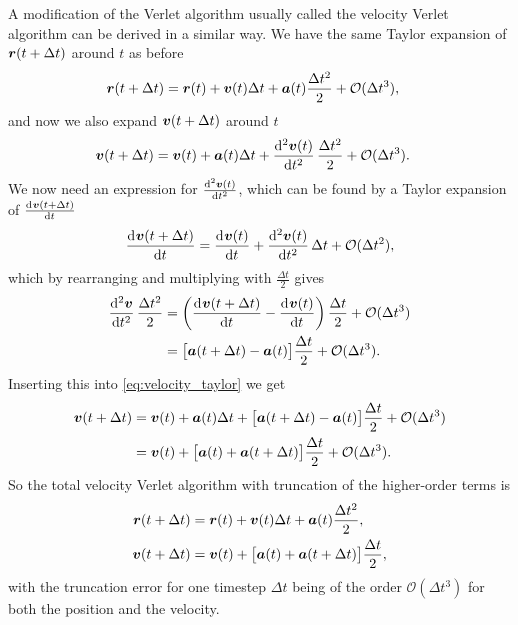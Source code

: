 A modification of the Verlet algorithm usually called the velocity Verlet algorithm\cite{swope1982computer}  can be derived in a similar way. We have the same Taylor expansion of $\boldsymbol{r}(t+\Delta t)$ around $t$ as before
\begin{align}
    \boldsymbol{r}(t + \Delta t) &= \boldsymbol{r}(t) + \boldsymbol{v}(t)\Delta t + \boldsymbol{a}(t)\frac{\Delta t^2}{2} + \mathcal{O}(\Delta t^3), \label{eq:position_taylor}
\end{align}
and now we also expand $\boldsymbol{v}(t + \Delta t)$ around $t$
\begin{align}
    \vvec(t + \Delta t) 
    &= \vvec(t) + \avec(t)\Delta t + \dod[2]{\vvec(t)}{t}\frac{\Delta t^2}{2} + \mathcal{O}(\Delta t^3).\label{eq:velocity_taylor}
\end{align}
We now need an expression for $\od[2]{\vvec(t)}{t}$, which can be found by a Taylor expansion of $\od{\vvec(t+\Delta t)}{t}$
\begin{align*}
    \dod{\vvec(t+\Delta t)}{t} = \dod{\vvec(t)}{t} + \dod[2]{\vvec(t)}{t}\Delta t + \mathcal{O}(\Delta t^2),
\end{align*}
which by rearranging and multiplying with $\frac{\Delta t}{2}$ gives
\begin{align*}
    \dod[2]{\vvec}{t}\frac{\Delta t^2}{2} 
    &= \left( \dod{\vvec(t+\Delta t)}{t} - \dod{\vvec(t)}{t}\right)\frac{\Delta t}{2} + \mathcal{O}(\Delta t^3) \\
    &= \big[\avec(t + \Delta t) - \avec(t)\big] \frac{\Delta t}{2} + \mathcal{O}(\Delta t^3).
\end{align*}
Inserting this into \cref{eq:velocity_taylor} we get
\begin{align}
    \boldsymbol{v}(t + \Delta t) 
    &= \boldsymbol{v}(t) + \boldsymbol{a}(t)\Delta t + \big[\boldsymbol{a}(t + \Delta t) - \boldsymbol{a}(t)\big] \frac{\Delta t}{2} + \mathcal{O}(\Delta t^3) \nonumber\\
    &= \boldsymbol{v}(t) + \big[\boldsymbol{a}(t) + \boldsymbol{a}(t + \Delta t)\big] \frac{\Delta t}{2} + \mathcal{O}(\Delta t^3).\label{eq:verlet_velocity_taylor_insertion}
\end{align}
So the total velocity Verlet algorithm with truncation of the higher-order terms is
\begin{align}
    \boldsymbol{r}(t + \Delta t) &= \boldsymbol{r}(t) + \boldsymbol{v}(t)\Delta t + \boldsymbol{a}(t)\frac{\Delta t^2}{2}, \label{eq:velocity_verlet_position}\\
    \boldsymbol{v}(t + \Delta t) &= \boldsymbol{v}(t) + \big[\boldsymbol{a}(t) + \boldsymbol{a}(t + \Delta t)\big] \frac{\Delta t}{2}\label{eq:velocity_verlet_velocity},
\end{align}
with the truncation error for one timestep $\Delta t$ being of the order $\mathcal{O}(\Delta t^3)$ for both the position and the velocity. 

